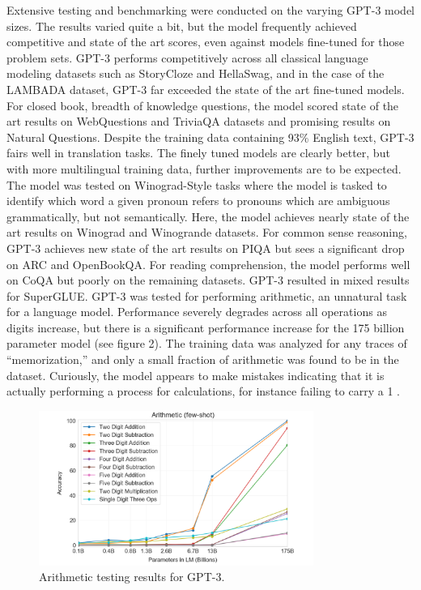 \documentclass[12pt]{article}
\begin{document}
Extensive testing and benchmarking were conducted on the varying GPT-3 model
sizes. The results varied quite a bit, but the model frequently achieved
competitive and state of the art scores, even against models fine-tuned for
those problem sets. GPT-3 performs competitively across all classical language
modeling datasets such as StoryCloze and HellaSwag, and in the case of the
LAMBADA dataset, GPT-3 far exceeded the state of the art fine-tuned models. For
closed book, breadth of knowledge questions, the model scored state of the art
results on WebQuestions and TriviaQA datasets and promising results on Natural
Questions. Despite the training data containing 93\% English text, GPT-3 fairs
well in translation tasks. The finely tuned models are clearly better, but with
more multilingual training data, further improvements are to be expected. The
model was tested on Winograd-Style tasks where the model is tasked to identify
which word a given pronoun refers to pronouns which are ambiguous
grammatically, but not semantically. Here, the model achieves nearly state of
the art results on Winograd and Winogrande datasets.  For common sense
reasoning, GPT-3 achieves new state of the art results on PIQA but sees a
significant drop on ARC and OpenBookQA. For reading comprehension, the model
performs well on CoQA but poorly on the remaining datasets. GPT-3 resulted in
mixed results for SuperGLUE. GPT-3 was tested for performing arithmetic, an
unnatural task for a language model. Performance severely degrades across all
operations as digits increase, but there is a significant performance increase
for the 175 billion parameter model (see figure 2). The training data was
analyzed for any traces of ``memorization,'' and only a small fraction of
arithmetic was found to be in the dataset. Curiously, the model appears to make
mistakes indicating that it is actually performing a process for calculations,
for instance failing to carry a 1 \cite{brown20}.

\begin{figure}[h]
	\centering
	\includegraphics[width=0.8\textwidth]{gpt-3-arithmetic.png}
	\caption{Arithmetic testing results for GPT-3. \cite{brown20}}
\end{figure}
\end{document}

